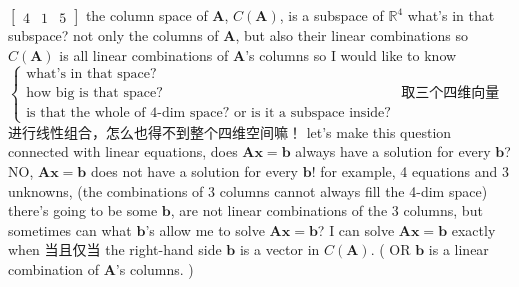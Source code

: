 \documentclass[12pt, a4paper]{article}
\begin{document}
{\begin{math}
\begin{bmatrix}
		4 & 1 & 5
	\end{bmatrix}
\end{math}
\newline
the column space of ${\mathbf{A}}$, $C(\mathbf{A})$, is a subspace of $\mathbb{R}^4$
\newline
what's in that subspace?
\newline
not only the columns of ${\mathbf{A}}$, but also their linear combinations
\vspace{14pt}
\newline
so $C(\mathbf{A})$ is all linear combinations of ${\mathbf{A}}$'s columns
\vspace{14pt}
\newline
so I would like to know
\begin{math}
	\left\{
		\begin{array}{l}
			\text{what's in that space?} \\
			\text{how big is that space?} \\
			\text{is that the whole of 4-dim space? or is it a subspace inside?}
		\end{array}
	\right.
\end{math}
\newline
取三个四维向量进行线性组合，怎么也得不到整个四维空间嘛！
\vspace{14pt}
\newline
let's make this question connected with linear equations, 
\newline
does ${\mathbf{A}}{\mathbf{x}} = {\mathbf{b}}$ always have a solution for every ${\mathbf{b}}$?
\newline
NO, ${\mathbf{A}}{\mathbf{x}} = {\mathbf{b}}$ does not have a solution for every ${\mathbf{b}}$!
\vspace{14pt}
\newline
for example, 4 equations and 3 unknowns, 
\newline
(the combinations of 3 columns cannot always fill the 4-dim space)
\newline
there's going to be some ${\mathbf{b}}$, are not linear combinations of the 3 columns, but sometimes can
\vspace{14pt}
\newline
what ${\mathbf{b}}$'s allow me to solve ${\mathbf{A}}{\mathbf{x}} = {\mathbf{b}}$?
\vspace{14pt}
\newline
I can solve ${\mathbf{A}}{\mathbf{x}} = {\mathbf{b}}$ {\textcolor{anhao-scarlet}{exactly when 当且仅当}} the right-hand side ${\mathbf{b}}$ is a vector in $C(\mathbf{A})$. ( {\textcolor{anhao-scarlet}{OR}} ${\mathbf{b}}$ is a linear combination of ${\mathbf{A}}$'s columns. )
}
\end{document}
